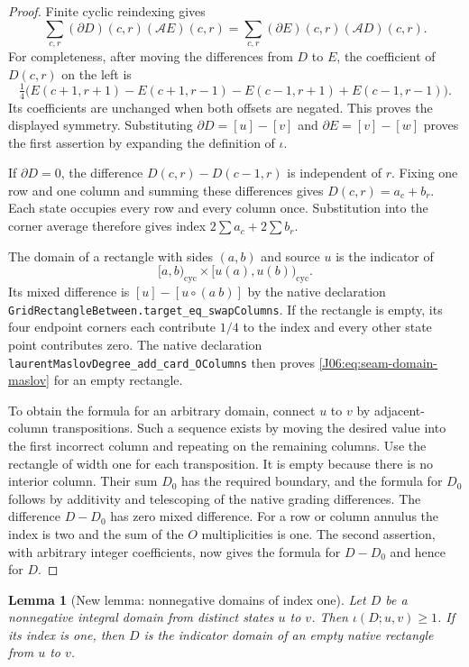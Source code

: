 \documentclass[11pt,oneside]{report}
\newtheorem{lemma}[theorem]{Lemma}
\theoremstyle{definition}
\numberwithin{equation}{section}
\newcommand{\decl}[1]{\textnormal{\nolinkurl{#1}}}
\begin{document}
\begin{proof}
Finite cyclic reindexing gives
\[
 \sum_{c,r}(\partial D)(c,r)(\mathcal A E)(c,r)
 =\sum_{c,r}(\partial E)(c,r)(\mathcal A D)(c,r).
\]
For completeness, after moving the differences from $D$ to $E$, the
coefficient of $D(c,r)$ on the left is
\[
 \tfrac14\bigl(E(c+1,r+1)-E(c+1,r-1)
             -E(c-1,r+1)+E(c-1,r-1)\bigr).
\]
Its coefficients are unchanged when both offsets are negated. This
proves the displayed symmetry. Substituting
$\partial D=[u]-[v]$ and $\partial E=[v]-[w]$ proves the first assertion
by expanding the definition of $\iota$.

If $\partial D=0$, the difference $D(c,r)-D(c-1,r)$ is independent
of $r$. Fixing one row and one column and summing these differences
gives $D(c,r)=a_c+b_r$. Each state occupies every row and every column
once. Substitution into the corner average therefore gives index
$2\sum a_c+2\sum b_r$.

The domain of a rectangle with sides $(a,b)$ and source $u$ is the
indicator of
\[
 [a,b)_{\mathrm{cyc}}\times[u(a),u(b))_{\mathrm{cyc}}.
\]
Its mixed difference is $[u]-[u\circ(a\ b)]$ by the native declaration
\decl{GridRectangleBetween.target_eq_swapColumns}.
If the rectangle is empty, its four endpoint corners each contribute
$1/4$ to the index and every other state point contributes zero.
The native declaration \decl{laurentMaslovDegree_add_card_OColumns}
then proves \eqref{J06:eq:seam-domain-maslov} for an empty rectangle.

To obtain the formula for an arbitrary domain, connect $u$ to $v$ by
adjacent-column transpositions. Such a sequence exists by moving the
desired value into the first incorrect column and repeating on the
remaining columns. Use the rectangle of width one for each transposition.
It is empty because there is no interior column. Their sum $D_0$ has
the required boundary, and the formula for $D_0$ follows by additivity
and telescoping of the native grading differences. The difference
$D-D_0$ has zero mixed difference. For a row or column annulus the
index is two and the sum of the $O$ multiplicities is one.
The second assertion, with arbitrary integer coefficients, now gives
the formula for $D-D_0$ and hence for $D$.
\end{proof}

\begin{lemma}[New lemma: nonnegative domains of index one]
\label{J06:lem:seam-index-one-rectangle}
Let $D$ be a nonnegative integral domain from distinct states $u$ to
$v$. Then $\iota(D;u,v)\ge1$. If its index is one, then $D$ is the
indicator domain of an empty native rectangle from $u$ to $v$.
\end{lemma}
\end{document}
